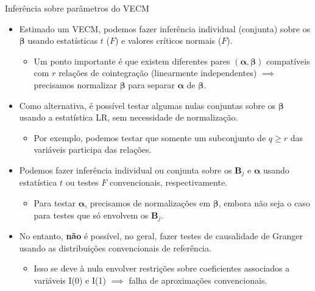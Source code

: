 \documentclass[11pt]{beamer}
\begin{document}
\begin{frame}{Inferência sobre parâmetros do VECM}
\begin{itemize}
	\item Estimado um VECM, podemos fazer inferência individual (conjunta) sobre  os $\boldsymbol{\beta}$ usando estatísticas $t$ ($F$) e valores críticos normais ($F$).
	\begin{itemize}
		\item Um ponto importante é que existem diferentes pares $(\boldsymbol{\alpha},\boldsymbol{\beta})$ compatíveis com $r$ relações de cointegração (linearmente independentes) $\implies$ precisamos normalizar $\boldsymbol{\beta}$ para separar $\boldsymbol{\alpha}$ de $\boldsymbol{\beta}$.
	\end{itemize}
	\item Como alternativa, é possível testar algumas nulas conjuntas sobre os $\boldsymbol{\beta}$ usando a estatística LR, sem necessidade de normalização.
\begin{itemize}
	\item Por exemplo, podemos testar que somente um subconjunto de $q \geq r$ das variáveis  participa das relações.
\end{itemize}
\item Podemos fazer inferência individual ou conjunta sobre os $\boldsymbol{B}_j$ e $\boldsymbol{\alpha}$ usando estatística $t$ ou testes $F$ convencionais, respectivamente.
\begin{itemize}
	\item Para testar $\boldsymbol{\alpha}$, precisamos de normalizações em $\boldsymbol{\beta}$, embora não seja o caso para testes que só envolvem os  $\boldsymbol{B}_j$.
\end{itemize}
	\item No entanto, \textbf{não} é possível, no geral, fazer testes de causalidade de Granger usando as distribuições convencionais de referência.
	\begin{itemize}
		\item Isso se deve à nula envolver restrições sobre coeficientes associados a variáveis I(0) e I(1) $\implies$ falha de aproximações convencionais.
	\end{itemize}
\end{itemize}
\end{frame}
\end{document}
